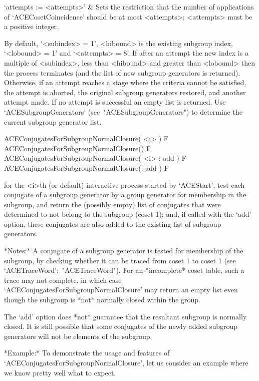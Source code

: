 \quad`attempts := <attempts>' &
Sets  the   restriction   that   the   number   of   applications   of
`ACECosetCoincidence' should be at most <attempts>; <attempts> must be
a positive integer.

\enditems

By default, `<subindex> =  1',  <hibound>  is  the  existing  subgroup
index, `<lobound> = 1' and `<attempts> = 8'. If after an  attempt  the
new index is a multiple of <subindex>, less than <hibound> and greater
than <lobound> then the  process  terminates  (and  the  list  of  new
subgroup generators is returned). Otherwise, if an attempt  reaches  a
stage where the criteria cannot be satisfied, the attempt is  aborted,
the original subgroup generators restored, and another  attempt  made.
If  no  attempt  is  successful  an  empty  list  is   returned.   Use
`ACESubgroupGenerators' (see~"ACESubgroupGenerators") to determine the
current subgroup generator list.

\>ACEConjugatesForSubgroupNormalClosure( <i> ) F
\>ACEConjugatesForSubgroupNormalClosure() F
\>ACEConjugatesForSubgroupNormalClosure( <i> : add ) F
\>ACEConjugatesForSubgroupNormalClosure(: add ) F

for the <i>th (or  default)  interactive  {\ACE}  process  started  by
`ACEStart', test each conjugate of a subgroup  generator  by  a  group
generator for membership in the subgroup,  and  return  the  (possibly
empty) list of conjugates that were determined to not  belong  to  the
subgroup (coset 1); and,  if  called  with  the  `add'  option,  these
conjugates are also added to the existing list of subgroup generators.

*Notes:* A conjugate of a subgroup generator is tested for  membership
of the subgroup, by checking whether it can be traced from coset 1  to
coset 1  (see  `ACETraceWord':~"ACETraceWord").  For  an  *incomplete*
coset  table,  such  a  trace  may  not  complete,   in   which   case
`ACEConjugatesForSubgroupNormalClosure' may return an empty list  even
though the subgroup is *not* normally closed within the group.

The `add' option does *not* guarantee that the resultant  subgroup  is
normally closed. It is still possible  that  some  conjugates  of  the
newly added subgroup generators will not be elements of the subgroup.

*Example:*
To      demonstrate      the      usage      and      features      of
`ACEConjugatesForSubgroupNormalClosure', let us  consider  an  example
where we know pretty well what to expect.

